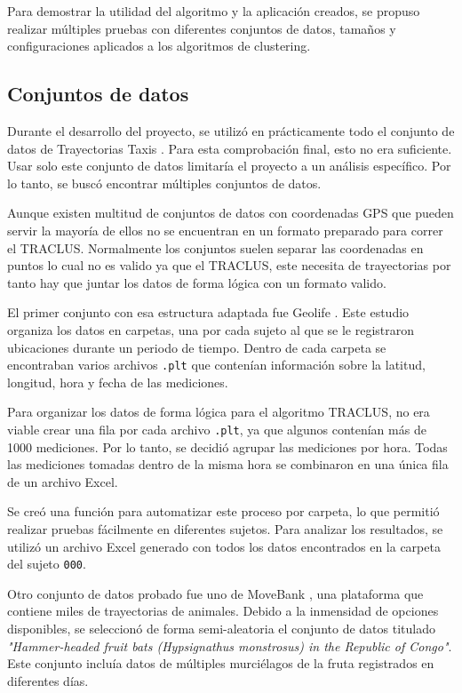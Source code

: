 Para demostrar la utilidad del algoritmo y la aplicación creados, se propuso realizar múltiples pruebas con diferentes conjuntos de datos, tamaños y configuraciones aplicados a los algoritmos de clustering.

\subsection{Conjuntos de datos}

Durante el desarrollo del proyecto, se utilizó en prácticamente todo el conjunto de datos de Trayectorias Taxis \cite{trayectorias_taxis}. Para esta comprobación final, esto no era suficiente. Usar solo este conjunto de datos limitaría el proyecto a un análisis específico. Por lo tanto, se buscó encontrar múltiples conjuntos de datos.

Aunque existen multitud de conjuntos de datos con coordenadas GPS que pueden servir la mayoría de ellos no se encuentran en un formato preparado para correr el TRACLUS. Normalmente los conjuntos suelen separar las coordenadas en puntos lo cual no es valido ya que el TRACLUS, este necesita de trayectorias por tanto hay que juntar los datos de forma lógica con un formato valido. 

El primer conjunto con esa estructura adaptada fue Geolife \cite{geolife_trajectories}. Este estudio organiza los datos en carpetas, una por cada sujeto al que se le registraron ubicaciones durante un periodo de tiempo. Dentro de cada carpeta se encontraban varios archivos \texttt{.plt} que contenían información sobre la latitud, longitud, hora y fecha de las mediciones. 

Para organizar los datos de forma lógica para el algoritmo TRACLUS, no era viable crear una fila por cada archivo \texttt{.plt}, ya que algunos contenían más de 1000 mediciones. Por lo tanto, se decidió agrupar las mediciones por hora. Todas las mediciones tomadas dentro de la misma hora se combinaron en una única fila de un archivo Excel.

Se creó una función para automatizar este proceso por carpeta, lo que permitió realizar pruebas fácilmente en diferentes sujetos. Para analizar los resultados, se utilizó un archivo Excel generado con todos los datos encontrados en la carpeta del sujeto \texttt{000}.

Otro conjunto de datos probado fue uno de MoveBank \cite{movebank}, una plataforma que contiene miles de trayectorias de animales. Debido a la inmensidad de opciones disponibles, se seleccionó de forma semi-aleatoria el conjunto de datos titulado \textit{"Hammer-headed fruit bats (Hypsignathus monstrosus) in the Republic of Congo"}. Este conjunto incluía datos de múltiples murciélagos de la fruta registrados en diferentes días. 

